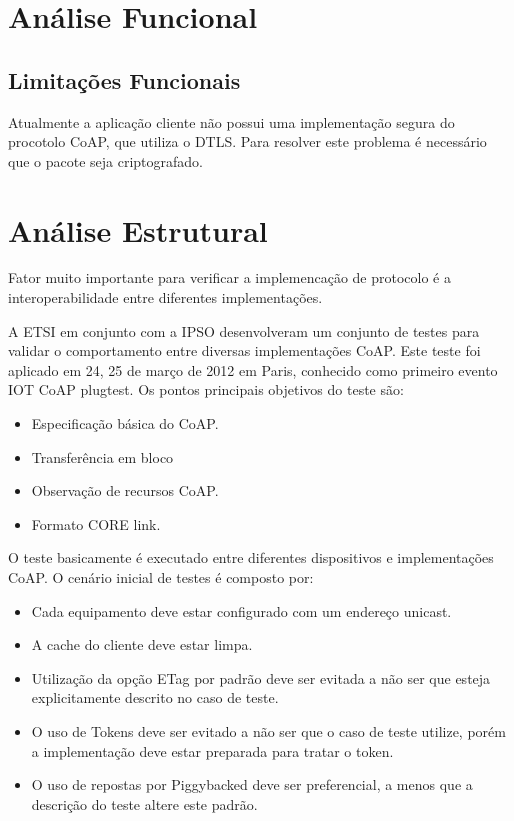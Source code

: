 \section{An\'alise Funcional}
\subsection{Limita\c{c}\~oes Funcionais}

Atualmente a aplica\c{c}\~ao cliente n\~ao possui uma implementa\c{c}\~ao segura do procotolo CoAP, que utiliza o DTLS.
Para resolver este problema \'e necess\'ario que o pacote seja criptografado.

\section{An\'alise Estrutural}

Fator muito importante para verificar a implemenca\c{c}\~ao de protocolo \'e a interoperabilidade entre diferentes implementa\c{c}\~oes.

A ETSI em conjunto com a IPSO desenvolveram um conjunto de testes para validar o comportamento entre diversas implementa\c{c}\~oes CoAP. Este teste foi aplicado em 24, 25 de mar\c{c}o de 2012 em Paris, conhecido como primeiro evento IOT CoAP plugtest.  Os pontos principais objetivos do teste s\~ao:

    \begin{itemize}
        \item Especifica\c{c}\~ao b\'asica do CoAP.
        \item Transfer\^encia em bloco
        \item Observa\c{c}\~ao de recursos CoAP.
        \item Formato CORE link.
    \end{itemize}

O teste basicamente \'e executado entre diferentes dispositivos e implementa\c{c}\~oes CoAP. O cen\'ario inicial de testes \'e composto por:
    \begin{itemize}
        \item Cada equipamento deve estar configurado com um endere\c{c}o unicast.
        \item A cache do cliente deve estar limpa.
        \item Utiliza\c{c}\~ao da op\c{c}\~ao ETag por padr\~ao deve ser evitada a n\~ao ser que esteja explicitamente descrito no caso de teste. 
        \item O uso de Tokens deve ser evitado a n\~ao ser que o caso de teste utilize, por\'em a implementa\c{c}\~ao deve estar preparada para tratar o token.
        \item O uso de repostas por Piggybacked deve ser preferencial, a menos que a descri\c{c}\~ao do teste altere este padr\~ao.
    \end{itemize}

